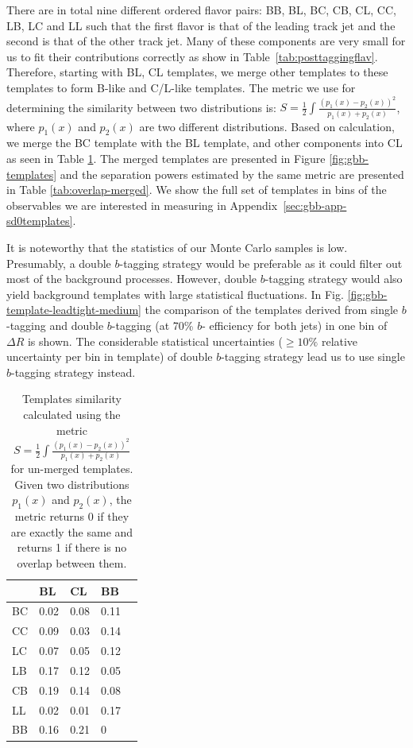 There are in total nine different ordered flavor pairs: BB, BL, BC, CB, CL, CC, 
LB, LC and LL such that the first flavor is that of the leading track jet and 
the second is that of the other track jet. Many of these components are very small 
for us to fit their contributions correctly as show in Table~\ref{tab:posttaggingflav}. 
Therefore, starting with BL, CL templates, we merge other templates to these templates
to form B-like and C/L-like templates. The metric we use for determining the similarity 
between two distributions is: $S=\frac{1}{2}\int \frac{(p_1(x)-p_2(x))^2}{p_1(x)+p_2(x)}$, 
where $p_1(x)$ and $p_2(x)$ are two different distributions. 
Based on calculation, we merge the BC template with the BL 
template, and other components into CL as seen in 
Table \ref{tab:overlap-unmerged}. The merged templates are 
presented in Figure \ref{fig:gbb-templates} and the separation powers estimated by the same metric are 
presented in Table \ref{tab:overlap-merged}. 
We show the full set of templates in bins of the observables we are interested in 
measuring in Appendix~\ref{sec:gbb-app-sd0templates}. 

It is noteworthy that the statistics of our Monte Carlo samples is low.
Presumably, a double $b$-tagging strategy would be preferable as it could filter 
out most of the background processes.
However, double $b$-tagging strategy would also yield background templates with large 
statistical fluctuations. In Fig. \ref{fig:gbb-template-leadtight-medium} the comparison 
of the templates derived from single $b$-tagging and double $b$-tagging (at 70\% $b$-
efficiency for both jets) in one bin of $\Delta R$ is shown. The considerable statistical uncertainties ($\geq 10\%$ relative uncertainty per bin in template)
of double $b$-tagging strategy lead us to use single $b$-tagging strategy instead. 


\begin{table}[htpb]
\centering
\begin{tabular}{|l|l|l|l|l|}
\hline
   & BL   & CL    & BB   \\ \hline
BC & 0.02 & 0.08  & 0.11 \\ \hline
CC & 0.09 & 0.03  & 0.14 \\ \hline
LC & 0.07 & 0.05  & 0.12 \\ \hline
LB & 0.17 & 0.12  & 0.05 \\ \hline
CB & 0.19 & 0.14  & 0.08 \\ \hline
LL & 0.02 & 0.01  & 0.17 \\ \hline
BB & 0.16 & 0.21  & 0    \\ \hline

\end{tabular}
\caption{Templates similarity calculated using the metric $S=\frac{1}{2}\int \frac{(p_1(x)-p_2(x))^2}{p_1(x)+p_2(x)}$ for un-merged templates. Given two distributions $p_1(x)$ and $p_2(x)$, the metric returns 0 if they are exactly the same and returns 1 if there is no overlap between them.}
\label{tab:overlap-unmerged}
\end{table}



